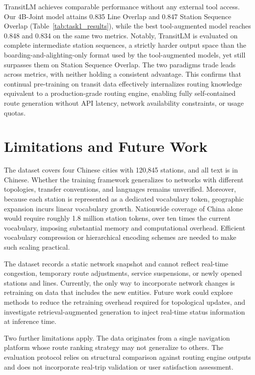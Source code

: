 \documentclass{article}
\begin{document}
TransitLM achieves comparable performance without any external tool access. Our 4B-Joint model attains 0.835 Line Overlap and 0.847 Station Sequence Overlap (Table~\ref{tab:task1_results}), while the best tool-augmented model reaches 0.848 and 0.834 on the same two metrics. Notably, TransitLM is evaluated on complete intermediate station sequences, a strictly harder output space than the boarding-and-alighting-only format used by the tool-augmented models, yet still surpasses them on Station Sequence Overlap. The two paradigms trade leads across metrics, with neither holding a consistent advantage. This confirms that continual pre-training on transit data effectively internalizes routing knowledge equivalent to a production-grade routing engine, enabling fully self-contained route generation without API latency, network availability constraints, or usage quotas.

\section{Limitations and Future Work}
\label{app:limitations}

The dataset covers four Chinese cities with 120,845 stations, and all text is in Chinese. Whether the training framework generalizes to networks with different topologies, transfer conventions, and languages remains unverified. Moreover, because each station is represented as a dedicated vocabulary token, geographic expansion incurs linear vocabulary growth. Nationwide coverage of China alone would require roughly 1.8 million station tokens, over ten times the current vocabulary, imposing substantial memory and computational overhead. Efficient vocabulary compression or hierarchical encoding schemes are needed to make such scaling practical.

The dataset records a static network snapshot and cannot reflect real-time congestion, temporary route adjustments, service suspensions, or newly opened stations and lines. Currently, the only way to incorporate network changes is retraining on data that includes the new entities. Future work could explore methods to reduce the retraining overhead required for topological updates, and investigate retrieval-augmented generation to inject real-time status information at inference time.

Two further limitations apply. The data originates from a single navigation platform whose route ranking strategy may not generalize to others. The evaluation protocol relies on structural comparison against routing engine outputs and does not incorporate real-trip validation or user satisfaction assessment.
\end{document}
